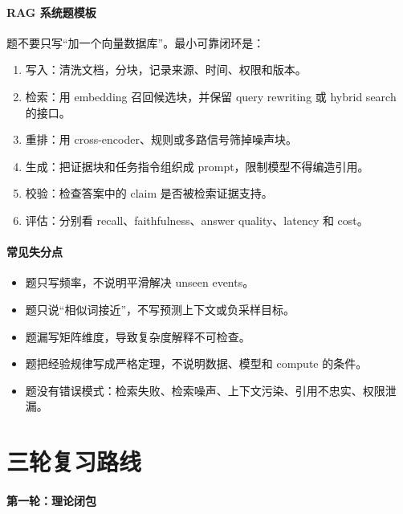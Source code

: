 \paragraph{RAG 系统题模板}

 题不要只写“加一个向量数据库”。最小可靠闭环是：

\begin{enumerate}
  \item 写入：清洗文档，分块，记录来源、时间、权限和版本。
  \item 检索：用 embedding 召回候选块，并保留 query rewriting 或 hybrid search 的接口。
  \item 重排：用 cross-encoder、规则或多路信号筛掉噪声块。
  \item 生成：把证据块和任务指令组织成 prompt，限制模型不得编造引用。
  \item 校验：检查答案中的 claim 是否被检索证据支持。
  \item 评估：分别看 recall、faithfulness、answer quality、latency 和 cost。
\end{enumerate}

\paragraph{常见失分点}

\begin{itemize}
  \item {} 题只写频率，不说明平滑解决 unseen events。
  \item {} 题只说“相似词接近”，不写预测上下文或负采样目标。
  \item {} 题漏写矩阵维度，导致复杂度解释不可检查。
  \item {} 题把经验规律写成严格定理，不说明数据、模型和 compute 的条件。
  \item {} 题没有错误模式：检索失败、检索噪声、上下文污染、引用不忠实、权限泄漏。
\end{itemize}

\section{三轮复习路线}

\paragraph{第一轮：理论闭包}

